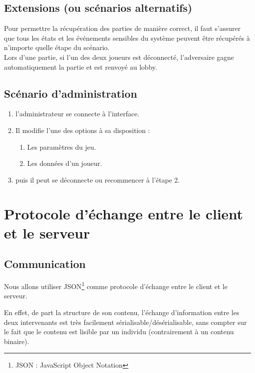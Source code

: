 \documentclass[a4paper,11pt]{article}
\begin{document}
		\subsection{Extensions (ou scénarios alternatifs)}
		Pour permettre la récupération des parties de manière correct, il faut s'assurer que tous les états et les événements sensibles du système peuvent être récupérés à n'importe quelle étape du scénario. \\

		Lors d'une partie, si l'un des deux joueurs est déconnecté, l'adversaire gagne automatiquement la partie et est renvoyé au lobby.

		\subsection{Scénario d'administration}
		\begin{enumerate}
			\item l'administrateur se connecte à l'interface.
			\item Il modifie l'une des options à sa disposition :
			\begin{enumerate}
				\item Les paramètres du jeu.
				\item Les données d'un joueur.
			\end{enumerate}
			\item puis il peut se déconnecte ou recommencer à l'étape 2.
		\end{enumerate}


	\newpage
	\section{Protocole d'échange entre le client et le serveur}
		\subsection{Communication}
			Nous allons utiliser JSON\footnote{JSON : JavaScript Object Notation} comme protocole d'échange entre le client et le serveur. \par
			En effet, de part la structure de son contenu, l'échange d'information entre les deux intervenants est très facilement sérialisable/désérialisable, sans compter sur le fait que le contenu est lisible par un individu (contrairement à un contenu binaire).
\end{document}
